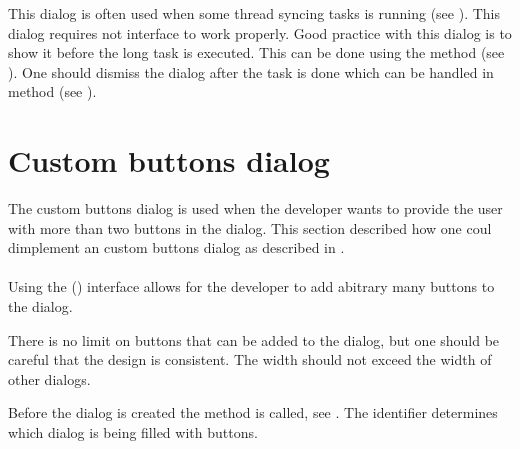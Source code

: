 \noindent
This dialog is often used when some thread syncing tasks is running (see ). This dialog requires not interface to work properly. Good practice with this dialog is to show it before the long task is executed. This can be done using the  method (see ). One should dismiss the dialog after the task is done which can be handled in  method (see ).



\section{Custom buttons dialog}
\label{sec:impl_custom_buttons}

The custom buttons dialog is used when the developer wants to provide the user with more than two buttons in the dialog. This section described how one coul dimplement an custom buttons dialog as described in .
\\\\
Using the  () interface allows for the developer to add abitrary many buttons to the dialog.

\begin{note}
    There is no limit on buttons that can be added to the dialog, but one should be careful that the design is consistent. The width should not exceed the width of other dialogs.
\end{note}



\noindent
Before the dialog is created the  method is called, see . The identifier  determines which dialog is being filled with buttons.

